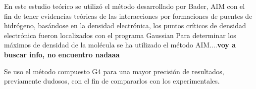 En este estudio teórico se utilizó el método desarrollado por Bader, AIM \cite{quimica6} con el fin de tener evidencias teóricas de las interacciones por formaciones de puentes de hidrógeno, basándose en la densidad electrónica, los puntos críticos de densidad electrónica fueron localizados con el programa Gaussian
Para determinar los máximos de densidad de la molécula se ha utilizado el método AIM....{\bfseries voy a buscar info, no encuentro nadaaa}

Se uso el método compuesto G4 para una mayor precisión de resultados, previamente dudosos, con el fin de compararlos con los experimentales.
 